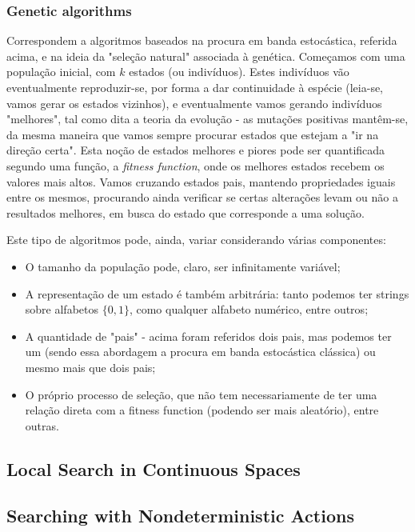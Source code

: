 \documentclass[11pt]{article}
\begin{document}
\subsubsection{Genetic algorithms}

Correspondem a algoritmos baseados na procura em banda estocástica, referida acima, e na ideia da "seleção natural" associada à genética. Começamos com uma população inicial, com $k$ estados (ou indivíduos). Estes indivíduos vão eventualmente reproduzir-se, por forma a dar continuidade à espécie (leia-se, vamos gerar os estados vizinhos), e eventualmente vamos gerando indivíduos "melhores", tal como dita a teoria da evolução - as mutações positivas mantêm-se, da mesma maneira que vamos sempre procurar estados que estejam a "ir na direção certa". Esta noção de estados melhores e piores pode ser quantificada segundo uma função, a \textit{fitness function}, onde os melhores estados recebem os valores mais altos. Vamos cruzando estados pais, mantendo propriedades iguais entre os mesmos, procurando ainda verificar se certas alterações levam ou não a resultados melhores, em busca do estado que corresponde a uma solução.\vspace{10pt}

Este tipo de algoritmos pode, ainda, variar considerando várias componentes:

\begin{itemize}[topsep=2pt,itemsep=0pt]
    \item O tamanho da população pode, claro, ser infinitamente variável;
    \item A representação de um estado é também arbitrária: tanto podemos ter strings sobre alfabetos $\{0,1\}$, como qualquer alfabeto numérico, entre outros;
    \item A quantidade de "pais" - acima foram referidos dois pais, mas podemos ter um (sendo essa abordagem a procura em banda estocástica clássica) ou mesmo mais que dois pais;
    \item O próprio processo de seleção, que não tem necessariamente de ter uma relação direta com a fitness function (podendo ser mais aleatório), entre outras.
\end{itemize}

\subsection{Local Search in Continuous Spaces}

\subsection{Searching with Nondeterministic Actions}
\end{document}
